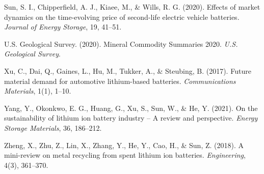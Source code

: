 \documentclass[10pt,a4paper,twocolumn]{article}
\begin{document}
\begin{thebibliography}{99}
Sun, S. I., Chipperfield, A. J., Kiaee, M., \& Wills, R. G. (2020).
\newblock Effects of market dynamics on the time-evolving price of second-life electric vehicle batteries.
\newblock \textit{Journal of Energy Storage}, 19, 41--51.

U.S. Geological Survey. (2020).
\newblock Mineral Commodity Summaries 2020.
\newblock \textit{U.S. Geological Survey}.

Xu, C., Dai, Q., Gaines, L., Hu, M., Tukker, A., \& Steubing, B. (2017).
\newblock Future material demand for automotive lithium-based batteries.
\newblock \textit{Communications Materials}, 1(1), 1--10.

Yang, Y., Okonkwo, E. G., Huang, G., Xu, S., Sun, W., \& He, Y. (2021).
\newblock On the sustainability of lithium ion battery industry – A review and perspective.
\newblock \textit{Energy Storage Materials}, 36, 186--212.

Zheng, X., Zhu, Z., Lin, X., Zhang, Y., He, Y., Cao, H., \& Sun, Z. (2018).
\newblock A mini-review on metal recycling from spent lithium ion batteries.
\newblock \textit{Engineering}, 4(3), 361--370.

\end{thebibliography}
\end{document}
